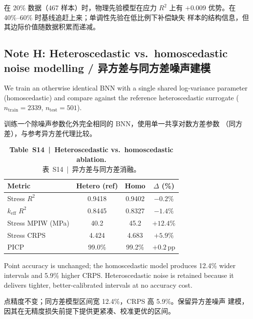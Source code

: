 \documentclass[11pt,a4paper]{article}
\newcommand{\keff}{\ensuremath{k_{\mathrm{eff}}}}
\begin{document}
在 20\% 数据（467 样本）时，物理先验模型在应力 $R^2$ 上有 $+0.009$
优势。在 40\%--60\% 时基线追赶上来；单调性先验在低比例下补偿缺失
样本的结构信息，但其边际价值随数据积累而递减。


\subsection{Note H: Heteroscedastic vs.\ homoscedastic noise modelling /
异方差与同方差噪声建模}
\label{sec:noteH}

We train an otherwise identical BNN with a single shared log-variance
parameter (homoscedastic) and compare against the reference
heteroscedastic surrogate ($n_{\mathrm{train}} = 2339$,
$n_{\mathrm{test}} = 501$).

训练一个除噪声参数化外完全相同的 BNN，使用单一共享对数方差参数
（同方差），与参考异方差代理比较。

\begin{table}[htbp]
\centering
\caption{\textbf{Table~S14~|~Heteroscedastic vs.\ homoscedastic ablation.}\\
\small 表~S14~|~异方差与同方差消融。}
\label{tab:S14}
\smallskip\small
\begin{tabular}{lccc}
\toprule
Metric & Hetero (ref) & Homo & $\Delta$ (\%) \\
\midrule
Stress $R^2$      & 0.9418 & 0.9402 & $-0.2$\%  \\
\keff{} $R^2$     & 0.8445 & 0.8327 & $-1.4$\%  \\
Stress MPIW (MPa) & 40.2   & 45.2   & $+12.4$\% \\
Stress CRPS       & 4.424  & 4.683  & $+5.9$\%  \\
PICP              & 99.0\% & 99.2\% & $+0.2$\,pp \\
\bottomrule
\end{tabular}
\end{table}

Point accuracy is unchanged; the homoscedastic model produces 12.4\%
wider intervals and 5.9\% higher CRPS. Heteroscedastic noise is retained
because it delivers tighter, better-calibrated intervals at no accuracy
cost.

点精度不变；同方差模型区间宽 12.4\%，CRPS 高 5.9\%。保留异方差噪声
建模，因其在无精度损失前提下提供更紧凑、校准更优的区间。


\end{document}

